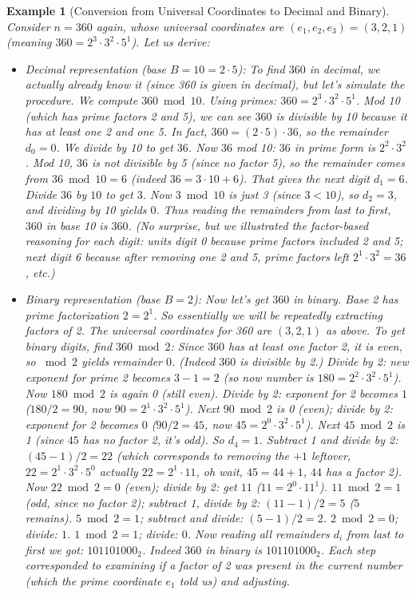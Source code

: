 \documentclass[11pt]{article}
\newtheorem{example}{Example}
\begin{document}
\begin{example}[Conversion from Universal Coordinates to Decimal and Binary]
Consider $n = 360$ again, whose universal coordinates are $(e_1,e_2,e_3) = (3,2,1)$ (meaning $360 = 2^3 \cdot 3^2 \cdot 5^1$). Let us derive:
\begin{itemize}
  \item \textit{Decimal representation (base $B=10=2\cdot 5$):} To find $360$ in decimal, we actually already know it (since 360 is given in decimal), but let's simulate the procedure. We compute $360 \bmod 10$. Using primes: $360 = 2^3\cdot3^2\cdot5^1$. Mod 10 (which has prime factors 2 and 5), we can see $360$ is divisible by 10 because it has at least one 2 and one 5. In fact, $360 = (2\cdot5)\cdot 36$, so the remainder $d_0 = 0$. We divide by 10 to get $36$. Now $36$ mod 10: $36$ in prime form is $2^2\cdot3^2$. Mod 10, $36$ is not divisible by 5 (since no factor 5), so the remainder comes from $36 \bmod 10 = 6$ (indeed $36 = 3\cdot 10 + 6$). That gives the next digit $d_1 = 6$. Divide $36$ by $10$ to get $3$. Now $3 \bmod 10$ is just 3 (since $3 < 10$), so $d_2 = 3$, and dividing by 10 yields $0$. Thus reading the remainders from last to first, $360$ in base 10 is $360$. (No surprise, but we illustrated the factor-based reasoning for each digit: units digit 0 because prime factors included 2 and 5; next digit 6 because after removing one 2 and 5, prime factors left $2^1\cdot3^2 = 36$, etc.)
  \item \textit{Binary representation (base $B=2$):} Now let's get $360$ in binary. Base 2 has prime factorization $2=2^1$. So essentially we will be repeatedly extracting factors of 2. The universal coordinates for 360 are $(3,2,1)$ as above. To get binary digits, find $360 \bmod 2$: Since $360$ has at least one factor 2, it is even, so $\bmod 2$ yields remainder $0$. (Indeed $360$ is divisible by 2.) Divide by 2: new exponent for prime 2 becomes $3-1=2$ (so now number is $180 = 2^2\cdot3^2\cdot5^1$). Now $180 \bmod 2$ is again 0 (still even). Divide by 2: exponent for 2 becomes $1$ ($180/2 = 90$, now $90=2^1\cdot3^2\cdot5^1$). Next $90 \bmod 2$ is 0 (even); divide by 2: exponent for 2 becomes $0$ ($90/2 = 45$, now $45=2^0\cdot3^2\cdot5^1$). Next $45 \bmod 2$ is 1 (since $45$ has no factor 2, it's odd). So $d_4 = 1$. Subtract 1 and divide by 2: $(45-1)/2 = 22$ (which corresponds to removing the $+1$ leftover, $22 = 2^1\cdot 3^2\cdot5^0$ actually $22=2^1\cdot11$, oh wait, $45 = 44+1$, $44$ has a factor 2). Now $22 \bmod 2 = 0$ (even); divide by 2: get $11$ ($11=2^0\cdot 11^1$). $11 \bmod 2 = 1$ (odd, since no factor 2); subtract 1, divide by 2: $(11-1)/2 = 5$ ($5$ remains). $5 \bmod 2 = 1$; subtract and divide: $(5-1)/2 = 2$. $2 \bmod 2 = 0$; divide: $1$. $1 \bmod 2 = 1$; divide: $0$. Now reading all remainders $d_i$ from last to first we got: $101101000_2$. Indeed $360$ in binary is $101101000_2$. Each step corresponded to examining if a factor of 2 was present in the current number (which the prime coordinate $e_1$ told us) and adjusting.

\end{itemize}
\end{example}
\end{document}
